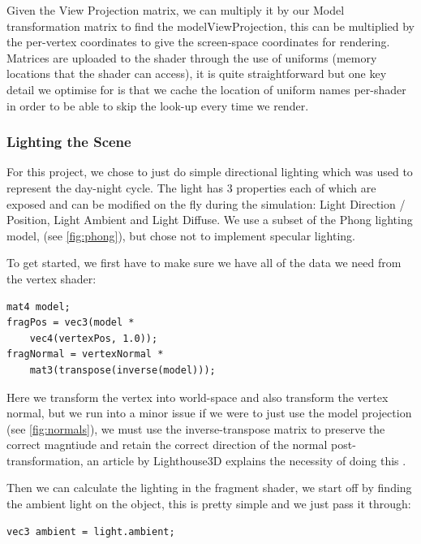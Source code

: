 \documentclass{article}
\begin{document}
\begin{multicols}{2}
                    Given the View Projection matrix, we can multiply it by our Model transformation matrix to find the modelViewProjection, this can be multiplied by the per-vertex coordinates to give the screen-space coordinates for rendering.
                    Matrices are uploaded to the shader through the use of uniforms (memory locations that the shader can access), it is quite straightforward but one key detail we optimise for is that we cache the location of uniform names per-shader in order to be able to skip the look-up every time we render.

                \subsubsection{Lighting the Scene}

                    For this project, we chose to just do simple directional lighting which was used to represent the day-night cycle. The light has 3 properties each of which are exposed and can be modified on the fly during the simulation: Light Direction / Position, Light Ambient and Light Diffuse. We use a subset of the Phong lighting model, (see \autoref{fig:phong}), but chose not to implement specular lighting.
    
                    To get started, we first have to make sure we have all of the data we need from the vertex shader:
                    
                    \begin{lstlisting}
mat4 model;
fragPos = vec3(model *
    vec4(vertexPos, 1.0));
fragNormal = vertexNormal *
    mat3(transpose(inverse(model)));\end{lstlisting}

                    Here we transform the vertex into world-space and also transform the vertex normal, but we run into a minor issue if we were to just use the model projection (see \autoref{fig:normals}), we must use the inverse-transpose matrix to preserve the correct magntiude and retain the correct direction of the normal post-transformation, an article by Lighthouse3D explains the necessity of doing this \cite{lighthouse3d}.

                    Then we can calculate the lighting in the fragment shader, we start off by finding the ambient light on the object, this is pretty simple and we just pass it through:

                    \begin{lstlisting}
vec3 ambient = light.ambient;\end{lstlisting}


\end{multicols}
\end{document}

